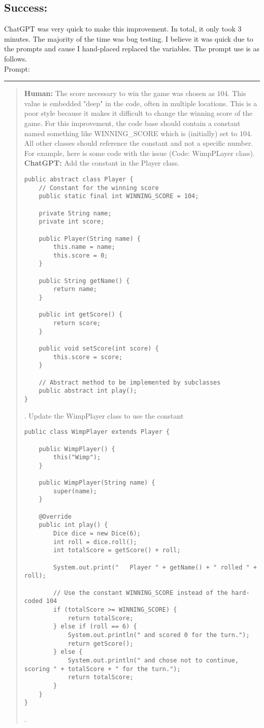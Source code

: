 \documentclass[a4paper,11pt]{article}
\begin{document}
\subsection*{Success:}
ChatGPT was very quick to make this improvement. In total, it only took 3 minutes. The majority of the time was bug testing. I believe it was quick due to the prompts and cause I hand-placed replaced the variables. The prompt use is as follows. \\
Prompt:
\hrule
\vspace{4pt} %
\begin{quote}
\textbf{Human:} The score necessary to win the game was chosen as $104$. This value is embedded "deep" in the code, often in multiple locations. This is a poor style because it makes it difficult to change the winning score of the game. For this improvement, the code base should contain a constant named something like WINNING\_SCORE which is (initially) set to $104$. All other classes should reference the constant and not a specific number. For example, here is some code with the issue (Code: WimpPLayer class).  \\
\textbf{ChatGPT:} Add the constant in the Player class.  \begin{lstlisting}
public abstract class Player {
    // Constant for the winning score
    public static final int WINNING_SCORE = 104;

    private String name;
    private int score;

    public Player(String name) {
        this.name = name;
        this.score = 0;
    }

    public String getName() {
        return name;
    }

    public int getScore() {
        return score;
    }

    public void setScore(int score) {
        this.score = score;
    }

    // Abstract method to be implemented by subclasses
    public abstract int play();
}
\end{lstlisting}. Update the WimpPlayer class to use the constant \begin{lstlisting}
public class WimpPlayer extends Player {

    public WimpPlayer() {
        this("Wimp");
    }

    public WimpPlayer(String name) {
        super(name);
    }

    @Override
    public int play() {
        Dice dice = new Dice(6);
        int roll = dice.roll();
        int totalScore = getScore() + roll;

        System.out.print("   Player " + getName() + " rolled " + roll);

        // Use the constant WINNING_SCORE instead of the hard-coded 104
        if (totalScore >= WINNING_SCORE) {
            return totalScore;
        } else if (roll == 6) {
            System.out.println(" and scored 0 for the turn.");
            return getScore();
        } else {
            System.out.println(" and chose not to continue, scoring " + totalScore + " for the turn.");
            return totalScore;
        }
    }
}
\end{lstlisting}.
\end{quote}
\end{document}
